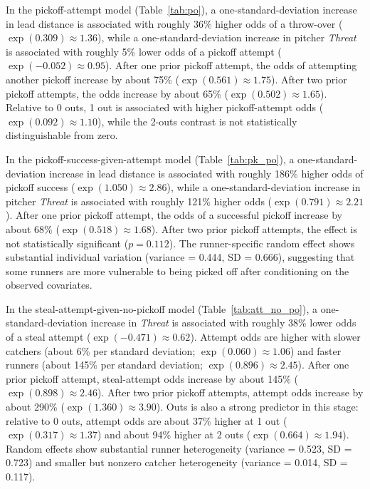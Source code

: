 \documentclass[12pt,letterpaper]{article}
\begin{document}
In the pickoff-attempt model (Table~\ref{tab:po}), a one-standard-deviation increase in lead distance is associated with roughly 36\% higher odds of a throw-over ($\exp(0.309)\approx1.36$), while a one-standard-deviation increase in pitcher \emph{Threat} is associated with roughly 5\% lower odds of a pickoff attempt ($\exp(-0.052)\approx0.95$). After one prior pickoff attempt, the odds of attempting another pickoff increase by about 75\% ($\exp(0.561)\approx1.75$). After two prior pickoff attempts, the odds increase by about 65\% ($\exp(0.502)\approx1.65$). Relative to 0 outs, 1 out is associated with higher pickoff-attempt odds ($\exp(0.092)\approx1.10$), while the 2-outs contrast is not statistically distinguishable from zero.

In the pickoff-success-given-attempt model (Table~\ref{tab:pk_po}), a one-standard-deviation increase in lead distance is associated with roughly 186\% higher odds of pickoff success ($\exp(1.050)\approx2.86$), while a one-standard-deviation increase in pitcher \emph{Threat} is associated with roughly 121\% higher odds ($\exp(0.791)\approx2.21$). After one prior pickoff attempt, the odds of a successful pickoff increase by about 68\% ($\exp(0.518)\approx1.68$). After two prior pickoff attempts, the effect is not statistically significant ($p=0.112$). The runner-specific random effect shows substantial individual variation (variance = 0.444, SD = 0.666), suggesting that some runners are more vulnerable to being picked off after conditioning on the observed covariates.

In the steal-attempt-given-no-pickoff model (Table~\ref{tab:att_no_po}), a one-standard-deviation increase in \emph{Threat} is associated with roughly 38\% lower odds of a steal attempt ($\exp(-0.471)\approx0.62$). Attempt odds are higher with slower catchers (about 6\% per standard deviation; $\exp(0.060)\approx1.06$) and faster runners (about 145\% per standard deviation; $\exp(0.896)\approx2.45$). After one prior pickoff attempt, steal-attempt odds increase by about 145\% ($\exp(0.898)\approx2.46$). After two prior pickoff attempts, attempt odds increase by about 290\% ($\exp(1.360)\approx3.90$). Outs is also a strong predictor in this stage: relative to 0 outs, attempt odds are about 37\% higher at 1 out ($\exp(0.317)\approx1.37$) and about 94\% higher at 2 outs ($\exp(0.664)\approx1.94$). Random effects show substantial runner heterogeneity (variance = 0.523, SD = 0.723) and smaller but nonzero catcher heterogeneity (variance = 0.014, SD = 0.117).
\end{document}
